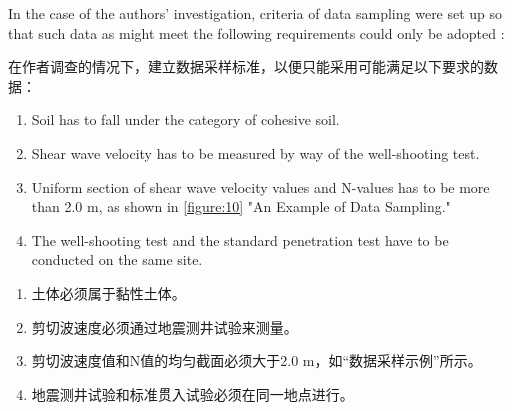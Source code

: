 
\begin{paracol}{2}

    In the case of the authors' investigation, criteria of data sampling were set up so that such data as might meet the following requirements could only be adopted :

    \switchcolumn

    在作者调查的情况下，建立数据采样标准，以便只能采用可能满足以下要求的数据：

    \switchcolumn*

    \begin{enumerate}
        \item Soil has to fall under the category of cohesive soil.
        \item Shear wave velocity has to be measured by way of the well-shooting test.
        \item Uniform section of shear wave velocity values and N-values has to be more than 2.0 m, as shown in \autoref{figure:10} "An Example of Data Sampling."
        \item The well-shooting test and the standard penetration test have to be conducted on the same site.
    \end{enumerate}

    \switchcolumn
    \begin{enumerate}
        \item 土体必须属于黏性土体。
        \item 剪切波速度必须通过地震测井试验来测量。
        \item 剪切波速度值和N值的均匀截面必须大于2.0 m，如“数据采样示例”所示。
        \item 地震测井试验和标准贯入试验必须在同一地点进行。
    \end{enumerate}
    
\end{paracol}



